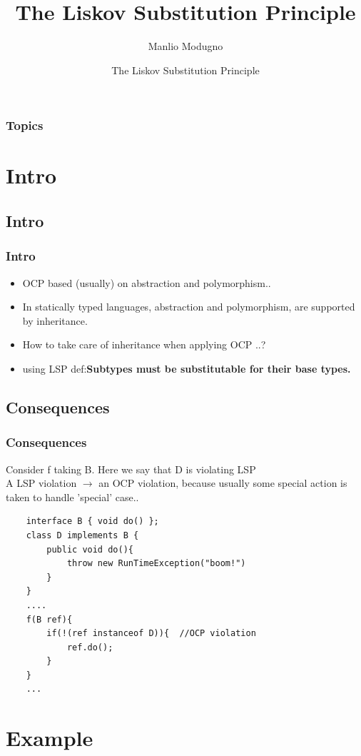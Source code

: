 \documentclass{beamer}
\title{The Liskov Substitution Principle}
\author{Manlio Modugno}
\institute[GMTechnologies]
\date[]{The Liskov Substitution Principle}
\begin{document}
\begin{frame}
  \titlepage
\end{frame}

\begin{frame}
  \frametitle{Topics}
  \tableofcontents
\end{frame}


\section{Intro}
\subsection{Intro}
\begin{frame}
  \frametitle{Intro}
  \begin{itemize}
	\item<+-> OCP based (usually) on abstraction and polymorphism..
	\item<+-> In statically typed languages, abstraction and polymorphism, are supported by inheritance.
	\item<+-> How to take care of inheritance when applying OCP ..? 
    \item<+-> using LSP def:\textbf{Subtypes must be substitutable for their base types.}
   \end{itemize}
\end{frame}

\subsection{Consequences}
\begin{frame}[containsverbatim]
	\frametitle{Consequences}
	Consider f taking B. Here we say that D is violating LSP \\
	A LSP violation $ \rightarrow $ an OCP violation, because usually some special action is taken to handle 'special' case.. \\
	\begin{lstlisting}
	interface B { void do() };
	class D implements B { 
		public void do(){
			throw new RunTimeException("boom!")
		}
	}
	....
	f(B ref){
		if(!(ref instanceof D)){  //OCP violation
			ref.do();	
		}
	}	
	...
	\end{lstlisting}
\end{frame}

\section{Example}
\end{document}
